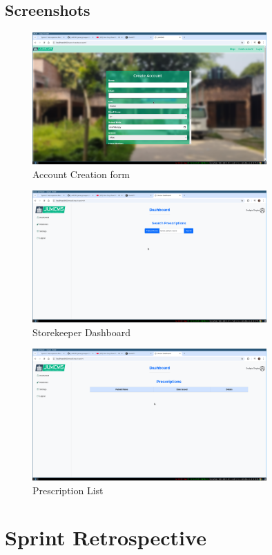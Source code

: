 \documentclass[a4paper,12pt]{article}
\begin{document}
\subsection{Screenshots}
\begin{figure}[H]
    \centering
    \includegraphics[width=0.8\textwidth]{images/spr1output2.png}
    \caption{Account Creation form}
    \label{fig:accountcreation}
\end{figure}

\begin{figure}[H]
    \centering
    \includegraphics[width=0.8\textwidth]{images/spr1output3.png}
    \caption{Storekeeper Dashboard}
    \label{fig:storekeeperdashboard}
\end{figure}

\begin{figure}[H]
    \centering
    \includegraphics[width=0.8\textwidth]{images/spr1output4.png}
    \caption{Prescription List}
    \label{fig:prescriptionlist}
\end{figure}
\newpage
\section{Sprint Retrospective}
\end{document}
